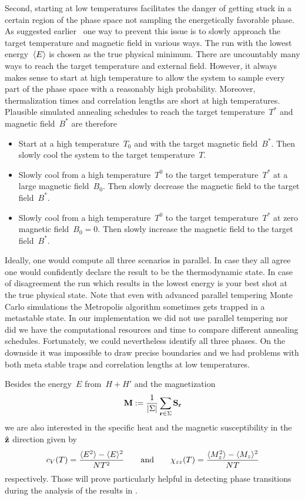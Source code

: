 Second, starting at low temperatures facilitates the danger of getting stuck in
a certain region of the phase space not sampling the energetically favorable
phase. As suggested earlier~\cite{skyrmion} one way to prevent this issue is to
slowly approach the target temperature and magnetic field in various ways. The
run with the lowest energy~$\langle E \rangle$ is chosen as the true physical minimum.
There are uncountably many ways to reach the target temperature and external
field. However, it always makes sense to start at high temperature to allow the
system to sample every part of the phase space with a reasonably high
probability. Moreover, thermalization times and correlation lengths are short at
high temperatures. Plausible simulated annealing schedules to reach the target
temperature~$T^*$ and magnetic field~$B^*$ are therefore

\begin{itemize}
  \item Start at a high temperature~$T_0$ and with the target magnetic
    field~$B^*$. Then slowly cool the system to the target temperature~$T$.
  \item Slowly cool from a high temperature~$T^0$ to the target
    temperature~$T^*$ at a large magnetic field~$B_0$. Then slowly decrease the
    magnetic field to the target field~$B^*$.
  \item Slowly cool from a high temperature~$T^0$ to the target
    temperature~$T^*$ at zero magnetic field~$B_0=0$. Then slowly increase the
    magnetic field to the target field~$B^*$.
\end{itemize}

Ideally, one would compute all three scenarios in parallel. In case they all
agree one would confidently declare the result to be the thermodynamic state. In
case of disagreement the run which results in the lowest energy is your best
shot at the true physical state. Note that even with advanced parallel tempering
Monte Carlo simulations the Metropolis algorithm sometimes gets trapped in a
metastable state. In our implementation we did not use parallel tempering nor
did we have the computational resources and time to compare different annealing
schedules. Fortunately, we could nevertheless identify all three phases. On the
downside it was impossible to draw precise boundaries and we had problems with
both meta stable traps and correlation lengths at low temperatures.

Besides the energy~$E$ from~$H + H'$ and the magnetization
%
\begin{equation}
  \M := \frac{1}{\abs{\Sigma}} \sum_{\r \in \Sigma} \S_{\r}
\end{equation}
%
we are also interested in the specific heat and the magnetic susceptibility in
the~$\hat{\mathbf{z}}$ direction given by
%
\begin{equation}
  c_V (T) = \frac{\langle E^2 \rangle - \langle E \rangle^2}{N T^2} \qquad\text{and}\qquad
  \chi_{zz} (T) = \frac{\langle M_z^2 \rangle - \langle M_z \rangle^2}{N T}
\end{equation}
%
respectively. Those will prove particularly helpful in detecting phase
transitions during the analysis of the results in .

